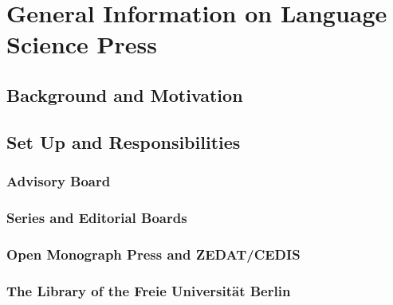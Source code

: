 \chapter{General Information on Language Science Press}

\section{Background and Motivation}

\section{Set Up and Responsibilities}

\subsection{Advisory Board}

\subsection{Series and Editorial Boards}

\subsection{Open Monograph Press and ZEDAT/CEDIS}

\subsection{The Library of the Freie Universität Berlin}


